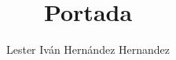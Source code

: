 \documentclass{article}
\title{Portada}
\author{Lester Iván Hernández Hernandez}
\begin{document}
    \portada{}
\end{document}
